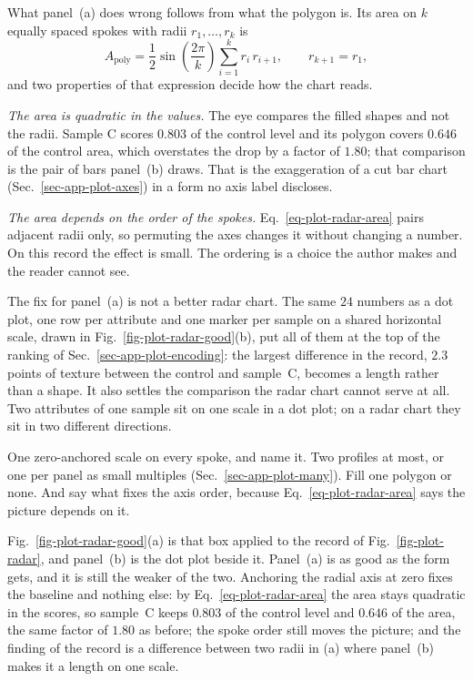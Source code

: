 What panel~(a) does wrong follows from what the polygon is. Its area on $k$ equally spaced spokes with radii $r_1,\dots,r_k$ is
\begin{equation}
	A_{\mathrm{poly}} = \frac{1}{2}\sin\!\left(\frac{2\pi}{k}\right)\sum_{i=1}^{k} r_i\,r_{i+1},
	\qquad r_{k+1} = r_1 ,
	\label{eq-plot-radar-area}
\end{equation}
and two properties of that expression decide how the chart reads.

\emph{The area is quadratic in the values.} The eye compares the filled shapes and not the radii. Sample C scores $0.803$ of the control level and its polygon covers $0.646$ of the control area, which overstates the drop by a factor of $1.80$; that comparison is the pair of bars panel~(b) draws. That is the exaggeration of a cut bar chart (Sec.~\ref{sec-app-plot-axes}) in a form no axis label discloses.

\emph{The area depends on the order of the spokes.} Eq.~\eqref{eq-plot-radar-area} pairs adjacent radii only, so permuting the axes changes it without changing a number. On this record the effect is small. The ordering is a choice the author makes and the reader cannot see.

The fix for panel~(a) is not a better radar chart. The same $24$ numbers as a dot plot, one row per attribute and one marker per sample on a shared horizontal scale, drawn in Fig.~\ref{fig-plot-radar-good}(b), put all of them at the top of the ranking of Sec.~\ref{sec-app-plot-encoding}: the largest difference in the record, $2.3$ points of texture between the control and sample~C, becomes a length rather than a shape. It also settles the comparison the radar chart cannot serve at all. Two attributes of one sample sit on one scale in a dot plot; on a radar chart they sit in two different directions.

\begin{box_yellow}
	One zero-anchored scale on every spoke, and name it. Two profiles at most, or one per panel as small multiples (Sec.~\ref{sec-app-plot-many}). Fill one polygon or none. And say what fixes the axis order, because Eq.~\eqref{eq-plot-radar-area} says the picture depends on it.
\end{box_yellow}

Fig.~\ref{fig-plot-radar-good}(a) is that box applied to the record of Fig.~\ref{fig-plot-radar}, and panel~(b) is the dot plot beside it. Panel~(a) is as good as the form gets, and it is still the weaker of the two. Anchoring the radial axis at zero fixes the baseline and nothing else: by Eq.~\eqref{eq-plot-radar-area} the area stays quadratic in the scores, so sample~C keeps $0.803$ of the control level and $0.646$ of the area, the same factor of $1.80$ as before; the spoke order still moves the picture; and the finding of the record is a difference between two radii in (a) where panel~(b) makes it a length on one scale.

